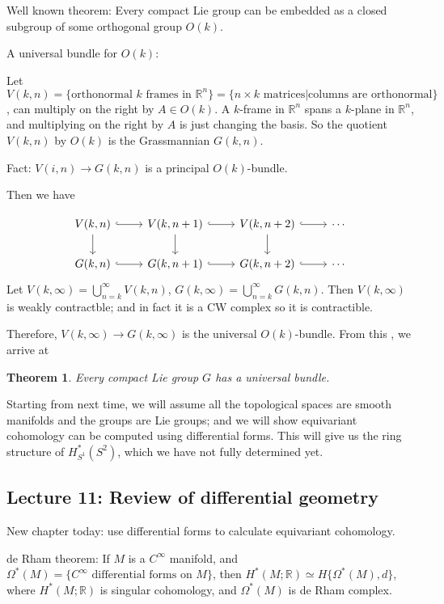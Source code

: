 \documentclass{article}
\theoremstyle{mystyle}
\newtheorem*{theorem*}{Theorem}
\theoremstyle{remark}
\numberwithin{equation}{section}
\begin{document}
Well known theorem: Every compact Lie group can be embedded as a closed subgroup of some orthogonal group $O(k)$.

A universal bundle for $O(k)$:

Let $V(k,n) = \{\text{orthonormal }k\text{ frames in }\mathbb{R}^n\} = \{n\times k\text{ matrices}|\text{columns are orthonormal}\}$,  can multiply on the right by $A\in O(k)$. A $k$-frame in $\mathbb{R}^n$ spans a $k$-plane in $\mathbb{R}^n$, and multiplying on the right by $A$ is just changing the basis. So the quotient $V(k,n)$ by $O(k)$ is the Grassmannian $G(k,n)$.

Fact: $V(i,n)\rightarrow G(k,n)$ is a principal $O(k)$-bundle.


Then we have

$$
\begin{tikzcd}
V(k,n) \ar[r,hook] \ar[d]& V(k,n+1) \ar[r,hook]\ar[d] & V(k,n+2) \ar[r,hook]\ar[d] & \cdots \\
G(k,n) \ar[r,hook] & G(k,n+1) \ar[r,hook] & G(k,n+2) \ar[r,hook] & \cdots
\end{tikzcd}
$$
Let $V(k,\infty) = \bigcup_{n=k}^\infty V(k,n)$, $G(k,\infty) = \bigcup_{n=k}^\infty G(k,n)$. Then $V(k,\infty)$ is weakly contractble; and in fact it is a CW complex so it is contractible. 

Therefore, $V(k,\infty)\rightarrow G(k,\infty)$ is the universal $O(k)$-bundle. From this , we arrive at

\begin{theorem*} 
Every compact Lie group $G$ has a universal bundle.
\end{theorem*}


Starting from next time, we will assume all the topological spaces are smooth manifolds and the groups are Lie groups; and we will show equivariant cohomology can be computed using differential forms. This will give us the ring structure of $H^*_{S^1}(S^2)$, which we have not fully determined yet.


\subsection{Lecture 11: Review of differential geometry}

New chapter today: use differential forms to calculate equivariant cohomology.

de Rham theorem: If $M$ is a $C^\infty$ manifold, and $\Omega^*(M) = \{C^\infty \text{ differential forms on }M\}$, then 
$H^*(M;\mathbb{R})\simeq H\{\Omega^*(M),d\}$, where $H^*(M;\mathbb{R})$ is singular cohomology, and $\Omega^*(M)$ is de Rham complex.
\end{document}
